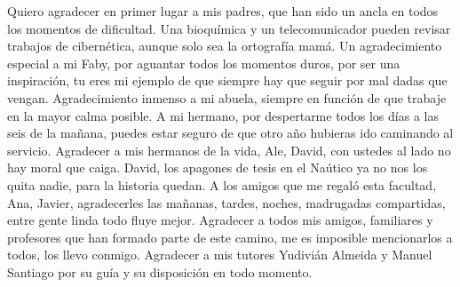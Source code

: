 \begin{acknowledgements}
    Quiero agradecer en primer lugar a mis padres, que han sido un ancla en todos los momentos de dificultad. Una 
bioquímica y un telecomunicador pueden revisar trabajos de cibernética, aunque solo sea la ortografía mamá. 
Un agradecimiento especial a mi Faby, por aguantar todos los momentos duros, por ser una inspiración, tu eres mi 
ejemplo de que siempre hay que seguir por mal dadas que vengan. Agradecimiento inmenso a mi abuela, siempre en función 
de que trabaje en la mayor calma posible. A mi hermano, por despertarme todos los días a las seis de la mañana, puedes 
estar seguro de que otro año hubieras ido caminando al servicio. Agradecer a mis hermanos de la vida, Ale, David, 
con ustedes al lado no hay moral que caiga. David, los apagones de tesis en el Naútico ya no nos los quita nadie, 
para la historia quedan. A los amigos que me regaló esta facultad, Ana, Javier, agradecerles las mañanas, tardes, 
noches, madrugadas compartidas, entre gente linda todo fluye mejor. Agradecer a todos mis amigos, familiares y profesores 
que han formado parte de este camino, me es imposible mencionarlos a todos, los llevo conmigo.
Agradecer a mis tutores Yudivián Almeida y Manuel Santiago por su guía y su disposición en todo momento.
\end{acknowledgements}